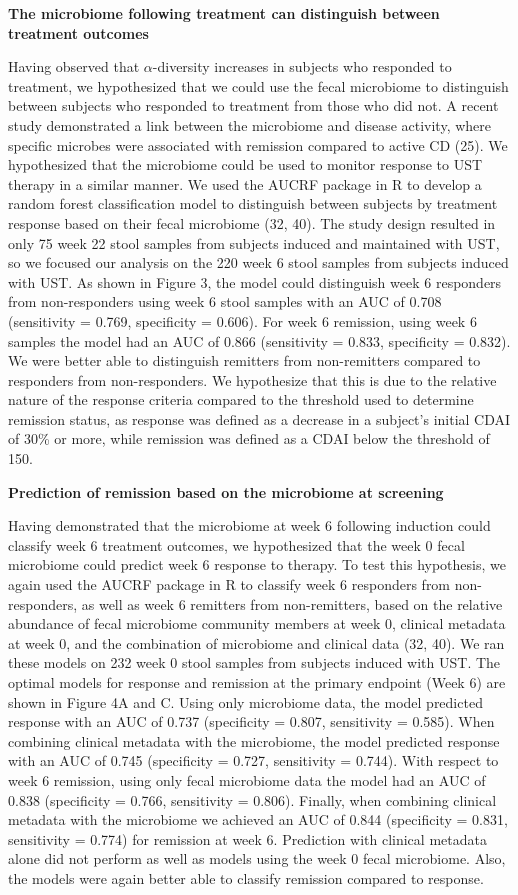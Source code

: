 \documentclass[11pt,]{article}
\begin{document}
\textbf{The microbiome following treatment can distinguish between
treatment outcomes}

Having observed that \({\alpha}\)-diversity increases in subjects who
responded to treatment, we hypothesized that we could use the fecal
microbiome to distinguish between subjects who responded to treatment
from those who did not. A recent study demonstrated a link between the
microbiome and disease activity, where specific microbes were associated
with remission compared to active CD (25). We hypothesized that the
microbiome could be used to monitor response to UST therapy in a similar
manner. We used the AUCRF package in R to develop a random forest
classification model to distinguish between subjects by treatment
response based on their fecal microbiome (32, 40). The study design
resulted in only 75 week 22 stool samples from subjects induced and
maintained with UST, so we focused our analysis on the 220 week 6 stool
samples from subjects induced with UST. As shown in Figure 3, the model
could distinguish week 6 responders from non-responders using week 6
stool samples with an AUC of 0.708 (sensitivity = 0.769, specificity =
0.606). For week 6 remission, using week 6 samples the model had an AUC
of 0.866 (sensitivity = 0.833, specificity = 0.832). We were better able
to distinguish remitters from non-remitters compared to responders from
non-responders. We hypothesize that this is due to the relative nature
of the response criteria compared to the threshold used to determine
remission status, as response was defined as a decrease in a subject's
initial CDAI of 30\% or more, while remission was defined as a CDAI
below the threshold of 150.

\textbf{Prediction of remission based on the microbiome at screening}

Having demonstrated that the microbiome at week 6 following induction
could classify week 6 treatment outcomes, we hypothesized that the week
0 fecal microbiome could predict week 6 response to therapy. To test
this hypothesis, we again used the AUCRF package in R to classify week 6
responders from non-responders, as well as week 6 remitters from
non-remitters, based on the relative abundance of fecal microbiome
community members at week 0, clinical metadata at week 0, and the
combination of microbiome and clinical data (32, 40). We ran these
models on 232 week 0 stool samples from subjects induced with UST. The
optimal models for response and remission at the primary endpoint (Week
6) are shown in Figure 4A and C. Using only microbiome data, the model
predicted response with an AUC of 0.737 (specificity = 0.807,
sensitivity = 0.585). When combining clinical metadata with the
microbiome, the model predicted response with an AUC of 0.745
(specificity = 0.727, sensitivity = 0.744). With respect to week 6
remission, using only fecal microbiome data the model had an AUC of
0.838 (specificity = 0.766, sensitivity = 0.806). Finally, when
combining clinical metadata with the microbiome we achieved an AUC of
0.844 (specificity = 0.831, sensitivity = 0.774) for remission at week
6. Prediction with clinical metadata alone did not perform as well as
models using the week 0 fecal microbiome. Also, the models were again
better able to classify remission compared to response.
\end{document}
